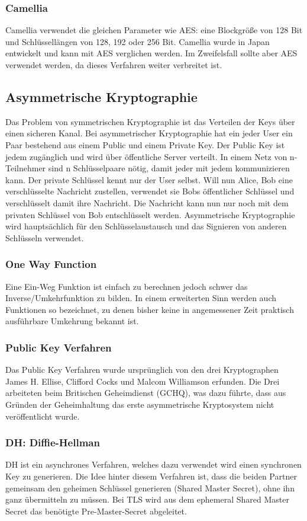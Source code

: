\subsubsection{Camellia}
Camellia verwendet die gleichen Parameter wie AES: eine Blockgröße von 128 Bit und Schlüssellängen von 128, 192 oder 256 Bit. Camellia wurde in Japan entwickelt und kann mit AES verglichen werden. Im Zweifelsfall sollte aber AES verwendet werden, da dieses Verfahren weiter verbreitet ist. 

\subsection{Asymmetrische Kryptographie}
Das Problem von symmetrischen Kryptographie ist das Verteilen der Keys über einen sicheren Kanal. Bei asymmetrischer Kryptographie hat ein jeder User ein Paar bestehend aus einem Public und einem Private Key. Der Public Key ist jedem zugänglich und wird über öffentliche Server verteilt. In einem Netz von n-Teilnehmer sind n Schlüsselpaare nötig, damit jeder mit jedem kommunizieren kann. Der private Schlüssel kennt nur der User selbst. Will nun Alice, Bob eine verschlüsselte Nachricht zustellen, verwendet sie Bobs öffentlicher Schlüssel und verschlüsselt damit ihre Nachricht. Die Nachricht kann nun nur noch mit dem privaten Schlüssel von Bob entschlüsselt werden.
Asymmetrische Kryptographie wird hauptsächlich für den Schlüsselaustausch und das Signieren von anderen Schlüsseln verwendet. 

\subsubsection{One Way Function}
Eine Ein-Weg Funktion ist einfach zu berechnen jedoch schwer das Inverse/Umkehrfunktion zu bilden. In einem erweiterten Sinn werden auch Funktionen so bezeichnet, zu denen bisher keine in angemessener Zeit praktisch ausführbare Umkehrung bekannt ist.

\subsubsection{Public Key Verfahren}
Das Public Key Verfahren wurde ursprünglich von den drei Kryptographen James H. Ellise, Clifford Cocks und Malcom Williamson erfunden. Die Drei arbeiteten  beim Britischen Geheimdienst (GCHQ), was dazu führte, dass aus Gründen der Geheimhaltung das erste asymmetrische Kryptosystem nicht veröffentlicht wurde.

\subsubsection{DH: Diffie-Hellman}
DH ist ein asynchrones Verfahren, welches dazu verwendet wird einen synchronen Key zu generieren. Die Idee 
hinter diesem Verfahren ist, dass die beiden Partner gemeinsam den geheimen Schlüssel generieren (Shared Master Secret), ohne ihn 
ganz übermitteln zu müssen. Bei TLS wird aus dem ephemeral Shared Master Secret das benötigte Pre-Master-Secret abgeleitet.

